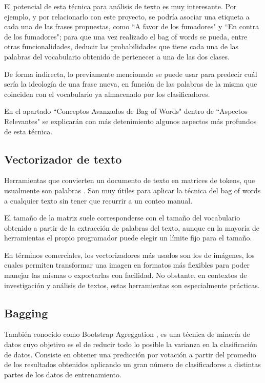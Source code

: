 El potencial de esta técnica para análisis de texto es muy interesante. Por ejemplo, y por relacionarlo con este proyecto, se podría asociar una etiqueta a cada una de las frases propuestas, como ``A favor de los fumadores" y ``En contra de los fumadores"; para que una vez realizado el bag of words se pueda, entre otras funcionalidades, deducir las probabilidades que tiene cada una de las palabras del vocabulario obtenido de pertenecer a una de las dos clases.

De forma indirecta, lo previamente mencionado se puede usar para predecir cuál sería la ideología de una frase nueva, en función de las palabras de la misma que coinciden con el vocabulario ya almacenado por los clasificadores.

En el apartado ``Conceptos Avanzados de Bag of Words" dentro de ``Aspectos Relevantes" se explicarán con más detenimiento algunos aspectos más profundos de esta técnica.

\subsection{Vectorizador de texto}

Herramientas que convierten un documento de texto en matrices de tokens, que usualmente son palabras  \cite{countvectorizer}.
Son muy útiles para aplicar la técnica del bag of words a cualquier texto sin tener que recurrir a un conteo manual.

El tamaño de la matriz suele corresponderse con el tamaño del vocabulario obtenido a partir de la extracción de palabras del texto, aunque en la mayoría de herramientas el propio programador puede elegir un límite fijo para el tamaño. 

En términos comerciales, los vectorizadores más usados son los de imágenes, los cuales permiten transformar una imagen en formatos más flexibles para poder manejar las mismas o exportarlas con facilidad. No obstante, en contextos de investigación y análisis de textos, estas herramientas son especialmente prácticas.

\subsection{Bagging}

También conocido como Bootstrap Agreggation \cite{breiman1996bagging}, es una técnica de minería de datos cuyo objetivo es el de reducir todo lo posible la varianza en la clasificación de datos. Consiste en obtener una predicción por votación a partir del promedio de los resultados obtenidos aplicando un gran número de clasificadores a distintas partes de los datos de entrenamiento.

